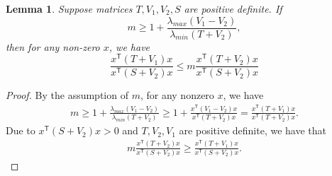 \documentclass[letterpaper, 10 pt, conference]{ieeeconf}  %
\newcommand{\transpose}{\mathsf{T}}
\newcommand{\quadinner}[1]{x^{\transpose}(#1)x}
\newtheorem{lemma}{Lemma}
\begin{document}
\begin{lemma}\label{lemma:m}
    Suppose matrices $T,V_{1},V_{2},S$ are positive definite. If
    \begin{equation}
        m \geq 1+\frac{\lambda_{max}(V_{1}-V_{2})}{\lambda_{min}(T+V_{2})},
    \end{equation}
    then for any non-zero $x$, we have
    \begin{equation}
        \frac{\quadinner{T+V_{1}}}{\quadinner{S+V_{2}}} \leq m\frac{\quadinner{T+V_{2}}}{\quadinner{S+V_{2}}}
    \end{equation}
\end{lemma}
\begin{proof}
    By the assumption of $m$, for any nonzero $x$, we have
    \begin{align*}
        m \geq 1+\frac{\lambda_{max}(V_{1}-V_{2})}{\lambda_{min}(T+V_{2})}
        \geq 1+ \frac{\quadinner{V_{1}-V_{2}}}{\quadinner{T+V_{2}}}
        = \frac{\quadinner{T+V_{1}}}{\quadinner{T+V_{2}}}.
     \end{align*}
     Due to $\quadinner{S+V_{2}} > 0$ and $T,V_{2},V_{1}$ are positive definite, we have that
     \begin{align*}
         m\frac{\quadinner{T+V_{2}}}{\quadinner{S+V_{2}}} \geq \frac{\quadinner{T+V_{1}}}{\quadinner{S+V_{2}}}.
     \end{align*}
\end{proof}



\end{document}
